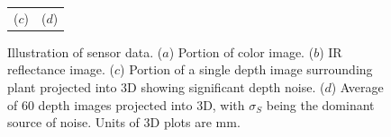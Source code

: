 \begin{figure}
\begin{center}
\begin{tabular}{ c c }
($c$) & ($d$) \\
\end{tabular}
\end{center}
   \caption{Illustration of sensor data.  ($a$) Portion of color image. ($b$) IR reflectance image. ($c$) Portion of a single depth image surrounding plant projected into $3$D showing significant depth noise. ($d$) Average of 60 depth images projected into $3$D, with $\sigma_S$ being the dominant source of noise.  Units of $3$D plots are mm.}
\label{fig:plantnoise}
\end{figure}


